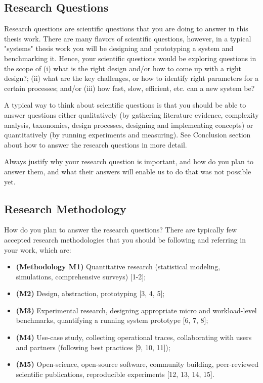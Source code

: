 \subsection{Research Questions}

Research questions are scientific questions that you are doing to answer in this thesis work. There are many flavors of scientific questions, however, in a typical "systems" thesis work you will be designing and prototyping a system and benchmarking it. Hence, your scientific questions would be exploring questions in the scope of (i) what is the right design and/or how to come up with a right design?; (ii) what are the key challenges, or how to identify right parameters for a certain processes; and/or (iii) how fast, slow, efficient, etc. can a new system be? 

A typical way to think about scientific questions is that you should be able to answer questions either qualitatively (by gathering literature evidence, complexity analysis, taxonomies, design processes, designing and implementing concepts) or quantitatively (by running experiments and measuring). See Conclusion section about how to answer the research questions in more detail. 

Always justify why your research question is important, and how do you plan to answer them, and what their answers will enable us to do that was not possible yet.  

\subsection{Research Methodology}
How do you plan to answer the research questions? There are typically few accepted research  methodologies that you should be following and referring in your work, which are: 
\begin{itemize}
    \item \textbf{(Methodology  M1)} Quantitative research (statistical modeling, simulations, comprehensive surveys) [1-2];
    \item \textbf{(M2)} Design, abstraction, prototyping [3, 4, 5];
    \item \textbf{(M3)} Experimental research, designing appropriate micro and workload-level benchmarks, quantifying a running system prototype [6, 7, 8];
    \item \textbf{(M4)} Use-case study, collecting operational traces, collaborating with users and partners (following best practices [9, 10, 11]);
    \item \textbf{(M5)} Open-science, open-source software, community building, peer-reviewed scientific publications, reproducible experiments [12, 13, 14, 15].
\end{itemize}

